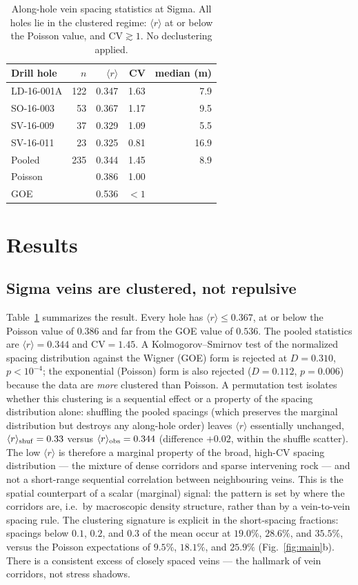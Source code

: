 \documentclass[11pt]{article}
\begin{document}
\begin{table}[t]
\centering
\caption{Along-hole vein spacing statistics at Sigma. All holes lie in the
clustered regime: $\langle r\rangle$ at or below the Poisson value, and
$\mathrm{CV}\gtrsim 1$. No declustering applied.}
\label{tab:holes}
\begin{tabular}{lrrrr}
\toprule
Drill hole & $n$ & $\langle r\rangle$ & CV & median (m) \\
\midrule
LD-16-001A & 122 & 0.347 & 1.63 & 7.9 \\
SO-16-003  & 53  & 0.367 & 1.17 & 9.5 \\
SV-16-009  & 37  & 0.329 & 1.09 & 5.5 \\
SV-16-011  & 23  & 0.325 & 0.81 & 16.9 \\
\midrule
Pooled     & 235 & 0.344 & 1.45 & 8.9 \\
\midrule
Poisson    &     & 0.386 & 1.00 & \\
GOE        &     & 0.536 & $<1$ & \\
\bottomrule
\end{tabular}
\end{table}

\section{Results}

\subsection{Sigma veins are clustered, not repulsive}
Table~\ref{tab:holes} summarizes the result. Every hole has
$\langle r\rangle \le 0.367$, at or below the Poisson value of $0.386$ and far
from the GOE value of $0.536$. The pooled statistics are
$\langle r\rangle=0.344$ and $\mathrm{CV}=1.45$. A Kolmogorov--Smirnov test of
the normalized spacing distribution against the Wigner (GOE) form is rejected at
$D=0.310$, $p<10^{-4}$; the exponential (Poisson) form is also rejected
($D=0.112$, $p=0.006$) because the data are \emph{more} clustered than Poisson.
A permutation test isolates whether this clustering is a sequential effect or a
property of the spacing distribution alone: shuffling the pooled spacings (which
preserves the marginal distribution but destroys any along-hole order) leaves
$\langle r\rangle$ essentially unchanged, $\langle r\rangle_{\rm shuf}=0.33$
versus $\langle r\rangle_{\rm obs}=0.344$ (difference $+0.02$, within the
shuffle scatter). The low $\langle r\rangle$ is therefore a marginal property of
the broad, high-CV spacing distribution --- the mixture of dense corridors and
sparse intervening rock --- and not a short-range sequential correlation between
neighbouring veins. This is the spatial counterpart of a scalar (marginal)
signal: the pattern is set by where the corridors are, i.e.\ by macroscopic
density structure, rather than by a vein-to-vein spacing rule.
The clustering signature is explicit in the short-spacing fractions: spacings
below $0.1$, $0.2$, and $0.3$ of the mean occur at $19.0\%$, $28.6\%$, and
$35.5\%$, versus the Poisson expectations of $9.5\%$, $18.1\%$, and $25.9\%$
(Fig.~\ref{fig:main}b). There is a consistent excess of closely spaced veins ---
the hallmark of vein corridors, not stress shadows.
\end{document}
